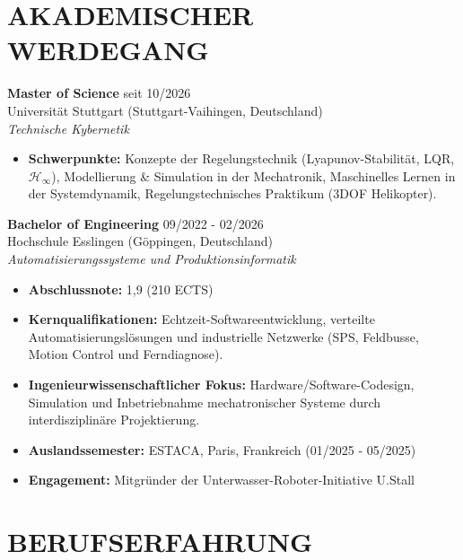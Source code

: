 \documentclass[10pt,a4paper]{article}
\begin{document}
\begin{minipage}[t]{0.66\textwidth}
    
    \section*{AKADEMISCHER WERDEGANG}
    \textbf{Master of Science} \hfill seit 10/2026\\
    Universität Stuttgart (Stuttgart-Vaihingen, Deutschland)\\[0.2em]
    \textit{Technische Kybernetik}
    \begin{itemize}
        \item \textbf{Schwerpunkte:} Konzepte der Regelungstechnik (Lyapunov-Stabilität, LQR, $\mathcal{H}_{\infty}$), Modellierung \& Simulation in der Mechatronik, Maschinelles Lernen in der Systemdynamik, Regelungstechnisches Praktikum (3DOF Helikopter).
    \end{itemize}
    \vspace{0.6em}

    \textbf{Bachelor of Engineering} \hfill 09/2022 - 02/2026\\
    Hochschule Esslingen (Göppingen, Deutschland)\\[0.2em]
    \textit{Automatisierungssysteme und Produktionsinformatik}
    \begin{itemize}
        \item \textbf{Abschlussnote:} 1,9 (210 ECTS)
        \item \textbf{Kernqualifikationen:} Echtzeit-Softwareentwicklung, verteilte Automatisierungslösungen und industrielle Netzwerke (SPS, Feldbusse, Motion Control und Ferndiagnose).
        \item \textbf{Ingenieurwissenschaftlicher Fokus:} Hardware/Software-Codesign, Simulation und Inbetriebnahme mechatronischer Systeme durch interdisziplinäre Projektierung.
        \item \textbf{Auslandssemester:} ESTACA, Paris, Frankreich (01/2025 - 05/2025)
        \item \textbf{Engagement:} Mitgründer der Unterwasser-Roboter-Initiative U.Stall
    \end{itemize}
    
    \vspace{0.8em}

    \section*{BERUFSERFAHRUNG}
    

\end{minipage}
\end{document}
